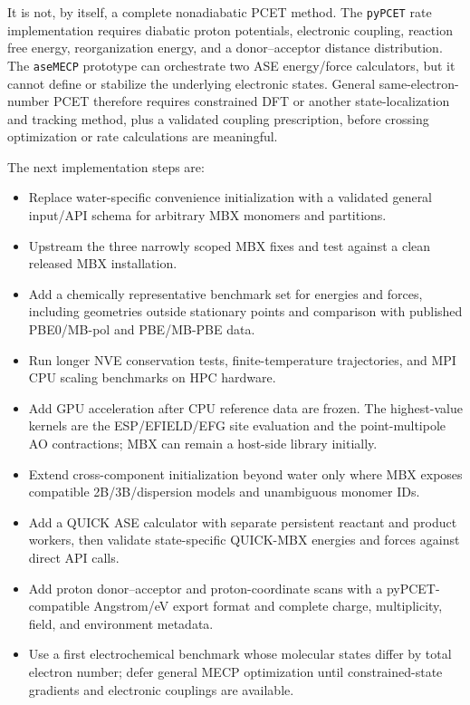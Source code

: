 \documentclass[11pt]{article}
\begin{document}
It is not, by itself, a complete nonadiabatic PCET method. The
\texttt{pyPCET} rate implementation requires diabatic proton potentials,
electronic coupling, reaction free energy, reorganization energy, and a
donor--acceptor distance distribution. The \texttt{aseMECP} prototype can
orchestrate two ASE energy/force calculators, but it cannot define or
stabilize the underlying electronic states. General same-electron-number
PCET therefore requires constrained DFT or another state-localization and
tracking method, plus a validated coupling prescription, before crossing
optimization or rate calculations are meaningful.

The next implementation steps are:
\begin{itemize}
  \item Replace water-specific convenience initialization with a validated
    general input/API schema for arbitrary MBX monomers and partitions.
  \item Upstream the three narrowly scoped MBX fixes and test against a clean
    released MBX installation.
  \item Add a chemically representative benchmark set for energies and
    forces, including geometries outside stationary points and comparison
    with published PBE0/MB-pol and PBE/MB-PBE data.
  \item Run longer NVE conservation tests, finite-temperature trajectories,
    and MPI CPU scaling benchmarks on HPC hardware.
  \item Add GPU acceleration after CPU reference data are frozen. The
    highest-value kernels are the ESP/EFIELD/EFG site evaluation and the
    point-multipole AO contractions; MBX can remain a host-side library
    initially.
  \item Extend cross-component initialization beyond water only where MBX
    exposes compatible 2B/3B/dispersion models and unambiguous monomer IDs.
  \item Add a QUICK ASE calculator with separate persistent reactant and
    product workers, then validate state-specific QUICK-MBX energies and
    forces against direct API calls.
  \item Add proton donor--acceptor and proton-coordinate scans with a
    pyPCET-compatible Angstrom/eV export format and complete charge,
    multiplicity, field, and environment metadata.
  \item Use a first electrochemical benchmark whose molecular states differ
    by total electron number; defer general MECP optimization until
    constrained-state gradients and electronic couplings are available.
\end{itemize}
\end{document}
